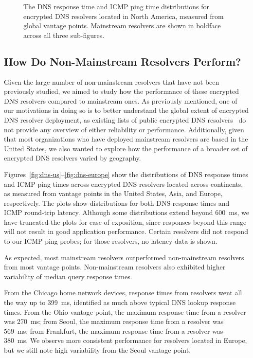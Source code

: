 \begin{figure}[t!]
\begin{minipage}{1.35\textwidth}
    \caption{The DNS response time and ICMP ping time distributions for
    encrypted DNS resolvers located in North America, measured from global vantage points.
    Mainstream resolvers are shown in boldface across all three
    sub-figures.}
\label{fig:dns-NA}
\end{minipage}
\end{figure}
\fi

\subsection{How Do Non-Mainstream Resolvers Perform?}

Given the large number of non-mainstream resolvers that have not been
previously studied, we aimed to study how
the performance of these encrypted DNS resolvers compared to mainstream ones.
As previously mentioned, one of our motivations in doing so is to better
understand the global extent of encrypted DNS resolver deployment, as existing
lists of public encrypted DNS resolvers~\cite{dnscrypt-public-resolvers} do
not provide any overview of either reliability or performance. Additionally,
given that most organizations who have deployed mainstream resolvers are based
in the United States, we also wanted to explore how the performance of a
broader set of encrypted DNS resolvers varied by geography.

Figures~\ref{fig:dns-us}--\ref{fig:dns-europe} show the distributions of DNS
response times and ICMP ping times across encrypted DNS resolvers located across continents, as measured
from vantage points in the United States, Asia, and Europe, respectively. The
plots show distributions for both DNS response times and ICMP round-trip latency. 
Although some distributions extend beyond 600~ms, we have truncated the plots
for ease of exposition, since responses beyond this range will not result in
good application performance.
Certain resolvers did not respond to our ICMP ping probes; for those
resolvers, no latency data is shown.


As expected, most mainstream resolvers outperformed non-mainstream resolvers
from most vantage points.
Non-mainstream resolvers also exhibited higher variability of 
median query response times.  

From the Chicago home network devices, response times from resolvers went all the way up to 
399~ms, identified as much above typical DNS lookup response times.
From the Ohio vantage point, the maximum response time from a resolver was 270~ms; from Seoul,
the maximum response time from a resolver was 569~ms; from Frankfurt, the maximum response time from a resolver was 380~ms. 
We observe more consistent performance for resolvers located in Europe, but we still 
note high variability from the Seoul vantage point. 

